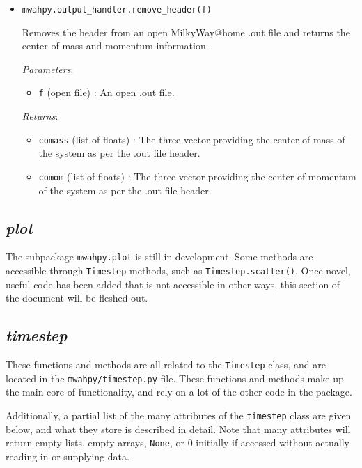 \documentclass{article}
\begin{document}
\begin{itemize}
\item \verb!mwahpy.output_handler.remove_header(f)!

Removes the header from an open MilkyWay@home .out file and returns the center of mass and momentum information.

\textit{Parameters}: \begin{itemize}

\item \verb!f! (open file) : An open .out file.

\end{itemize}

\textit{Returns}: \begin{itemize} 

\item \verb!comass! (list of floats) : The three-vector providing the center of mass of the system as per the .out file header.

\item \verb!comom! (list of floats) : The three-vector providing the center of momentum of the system as per the .out file header.

\end{itemize}



\end{itemize}

\subsection{\textit{plot}}

The subpackage \verb!mwahpy.plot! is still in development. Some methods are accessible through \verb!Timestep! methods, such as \verb!Timestep.scatter()!. Once novel, useful code has been added that is not accessible in other ways, this section of the document will be fleshed out.

\subsection{\textit{timestep}} \label{sec:doc_timestep}

These functions and methods are all related to the \verb!Timestep! class, and are located in the \verb!mwahpy/timestep.py! file. These functions and methods make up the main core of \mwahpy functionality, and rely on a lot of the other code in the package.

Additionally, a partial list of the many attributes of the \verb!timestep! class are given below, and what they store is described in detail. Note that many attributes will return empty lists, empty arrays, \verb!None!, or 0 initially if accessed without actually reading in or supplying data. 
\end{document}
